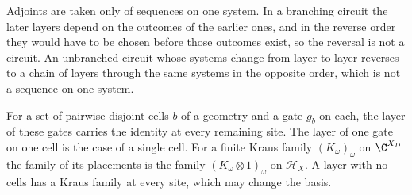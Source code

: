 Adjoints are taken only of sequences on one system. In a branching circuit the
later layers depend on the outcomes of the earlier ones, and in the reverse order
they would have to be chosen before those outcomes exist, so the reversal is not a
circuit. An unbranched circuit whose systems change from layer to layer reverses to
a chain of layers through the same systems in the opposite order, which is not a
sequence on one system.

\begin{definition}
    \label{def:circuits_of_cells}
    \leanok
    For a set of pairwise disjoint cells $b$ of a geometry and a gate $g_b$ on each,
    the layer of these gates carries the identity at every remaining site. The layer of
    one gate on one cell is the case of a single cell. For a finite Kraus family
    $(K_\omega)_\omega$ on $\C^{X_D}$ the family of its placements is the family
    $(K_\omega\otimes1)_\omega$ on $\mathcal H_X$. A layer with no cells has a Kraus
    family at every site, which may change the basis.
\end{definition}

